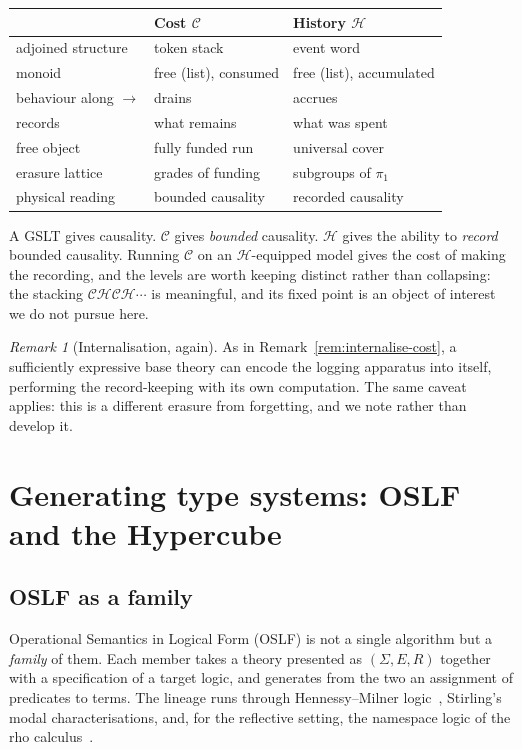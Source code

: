 \documentclass[11pt]{article}
\theoremstyle{definition}
\theoremstyle{plain}
\theoremstyle{remark}
\newtheorem{remark}[definition]{Remark}
\newcommand{\cost}{\mathcal{C}}
\newcommand{\hist}{\mathcal{H}}
\begin{document}
\begin{center}
\begin{tabular}{@{}lll@{}}
\toprule
& \textbf{Cost $\cost$} & \textbf{History $\hist$} \\
\midrule
adjoined structure & token stack & event word \\
monoid             & free (list), consumed & free (list), accumulated \\
behaviour along $\longrightarrow$ & drains & accrues \\
records            & what remains & what was spent \\
free object        & fully funded run & universal cover \\
erasure lattice    & grades of funding & subgroups of $\pi_1$ \\
physical reading   & bounded causality & recorded causality \\
\bottomrule
\end{tabular}
\end{center}

A GSLT gives causality. $\cost$ gives \emph{bounded} causality. $\hist$ gives the ability
to \emph{record} bounded causality. Running $\cost$ on an $\hist$-equipped model gives the
cost of making the recording, and the levels are worth keeping distinct rather than
collapsing: the stacking $\cost\hist\cost\hist\cdots$ is meaningful, and its fixed point
is an object of interest we do not pursue here.

\begin{remark}[Internalisation, again]
As in Remark~\ref{rem:internalise-cost}, a sufficiently expressive base theory can encode
the logging apparatus into itself, performing the record-keeping with its own
computation. The same caveat applies: this is a different erasure from forgetting, and we
note rather than develop it.
\end{remark}

\section{Generating type systems: OSLF and the Hypercube}
\label{sec:hypercube}

\subsection{OSLF as a family}

Operational Semantics in Logical Form (OSLF) is not a single algorithm but a
\emph{family} of them. Each member takes a theory presented as $(\Sigma, E, R)$ together
with a specification of a target logic, and generates from the two an assignment of
predicates to terms. The lineage runs through Hennessy--Milner
logic~\cite{HennessyMilner1985}, Stirling's modal characterisations, and, for the
reflective setting, the namespace logic of the rho calculus~\cite{MeredithRadestock2005b}.
\end{document}
